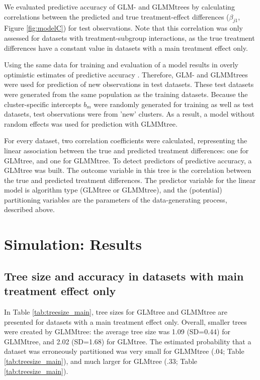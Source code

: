 \documentclass[nobf,doc]{apa}
\begin{document}
We evaluated predictive accuracy of GLM- and GLMMtrees by calculating correlations between the predicted and true treatment-effect differences ($\beta_{j1}$, Figure \ref{fig:modelC}) for test observations. Note that this correlation was only assessed for datasets with treatment-subgroup interactions, as the true treatment differences have a constant value in datasets with a main treatment effect only.

Using the same data for training and evaluation of a model results in overly optimistic estimates of predictive accuracy \cite{HastyTibs09}. Therefore, GLM- and GLMMtrees were used for prediction of new observations in test datasets. These test datasets were generated from the same population as the training datasets. Because the cluster-specific intercepts $b_m$ were randomly generated for training as well as test datasets, test observations were from 'new' clusters. As a result, a model without random effects was used for prediction with GLMMtree.

For every dataset, two correlation coefficients were calculated, representing the linear association between the true and predicted treatment differences: one for GLMtree, and one for GLMMtree. To detect predictors of predictive accuracy, a GLMtree was built. The outcome variable in this tree is the correlation between the true and predicted treatment differences. The predictor variable for the linear model is algorithm type (GLMtree or GLMMtree), and the (potential) partitioning variables are the parameters of the data-generating process, described above. 



\section{Simulation: Results}

\subsection{Tree size and accuracy in datasets with main treatment effect only}

In Table \ref{tab:treesize_main}, tree sizes for GLMtree and GLMMtree are presented for datasets with a main treatment effect only. Overall, smaller trees were created by GLMMtree: the average tree size was 1.09 (SD=0.44) for GLMMtree, and 2.02 (SD=1.68) for GLMtree. The estimated probability that a dataset was erroneously partitioned was very small for GLMMtree (.04; Table \ref{tab:treesize_main}), and much larger for GLMtree (.33; Table \ref{tab:treesize_main}). 
\end{document}
